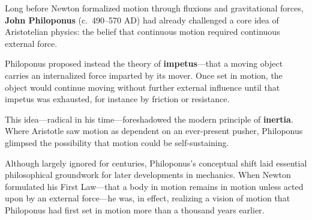 \begin{tcolorbox}[colback=gray!5!white, colframe=black, title=\textbf{Historical Footnote: Philoponus and the Seeds of Inertia}, fonttitle=\bfseries, arc=1.5mm, boxrule=0.4pt]

  Long before Newton formalized motion through fluxions and gravitational forces, \textbf{John Philoponus} (c.~490--570 AD) had already challenged a core idea of Aristotelian physics: the belief that continuous motion required continuous external force.
  
  Philoponus proposed instead the theory of \textbf{impetus}---that a moving object carries an internalized force imparted by its mover. Once set in motion, the object would continue moving without further external influence until that impetus was exhausted, for instance by friction or resistance.
  
  \medskip
  
  This idea---radical in his time---foreshadowed the modern principle of \textbf{inertia}. Where Aristotle saw motion as dependent on an ever-present pusher, Philoponus glimpsed the possibility that motion could be self-sustaining.
  
  \medskip
  
  Although largely ignored for centuries, Philoponus's conceptual shift laid essential philosophical groundwork for later developments in mechanics. When Newton formulated his First Law---that a body in motion remains in motion unless acted upon by an external force---he was, in effect, realizing a vision of motion that Philoponus had first set in motion more than a thousand years earlier.
  
\end{tcolorbox}
